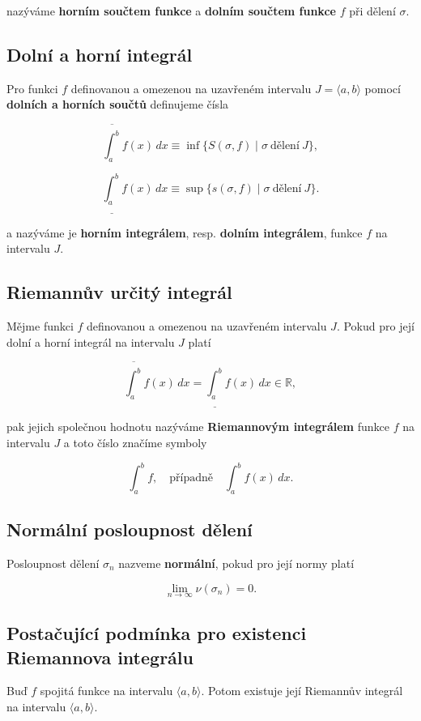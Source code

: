 \noindent nazýváme \textbf{horním součtem funkce} a \textbf{dolním součtem funkce} $f$ při dělení $\sigma$.

\subsection*{Dolní a horní integrál}

Pro funkci $f$ definovanou a omezenou na uzavřeném intervalu $J=\langle a,b
    \rangle$ pomocí \textbf{dolních a horních součtů} definujeme čísla

\[ \overline{\int_a^b} f(x) \,dx \equiv \inf\{ S(\sigma, f) \mid \sigma \ \text{dělení} \ J \}, \]

\[ \underline{\int_a^b} f(x) \,dx \equiv \sup\{ s(\sigma, f) \mid \sigma \ \text{dělení} \ J \}. \]

\noindent a nazýváme je \textbf{horním integrálem}, resp. \textbf{dolním integrálem}, funkce $f$ na intervalu $J$.

\subsection*{Riemannův určitý integrál}

Mějme funkci $f$ definovanou a omezenou na uzavřeném intervalu $J$. Pokud pro
její dolní a horní integrál na intervalu $J$ platí

\[ \overline{\int_a^b} f(x)\,dx = \underline{\int_a^b} f(x) \,dx \in \mathbb{R}, \]

\noindent pak jejich společnou hodnotu nazýváme \textbf{Riemannovým integrálem} funkce $f$ na intervalu $J$ a toto číslo značíme symboly

\[ \int_a^b f, \quad \text{případně} \quad \int_a^b f(x)\,dx. \]

\subsection*{Normální posloupnost dělení}

Posloupnost dělení $\sigma_n$ nazveme \textbf{normální}, pokud pro její normy
platí

\[ \lim_{n\to\infty} \nu(\sigma_n) = 0. \]

\subsection*{Postačující podmínka pro existenci Riemannova integrálu}

Buď $f$ spojitá funkce na intervalu $\langle a,b \rangle$. Potom existuje její
Riemannův integrál na intervalu $\langle a,b\rangle$.

